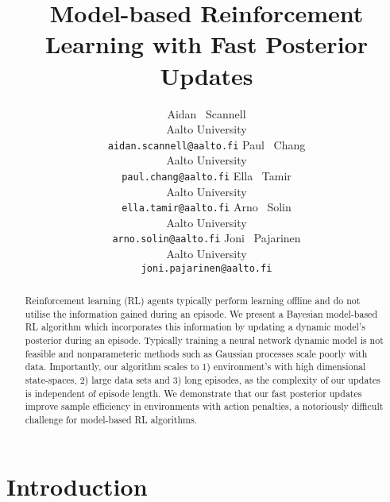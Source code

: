 \documentclass{article}
\title{Model-based Reinforcement Learning with Fast Posterior Updates}
\author{%
  Aidan ~Scannell \\
  Aalto University\\
  \texttt{aidan.scannell@aalto.fi}
  \And
  Paul ~Chang \\
  Aalto University\\
  \texttt{paul.chang@aalto.fi}
  \And
  Ella ~Tamir \\
  Aalto University\\
  \texttt{ella.tamir@aalto.fi}
  \And
  Arno ~Solin \\
  Aalto University\\
  \texttt{arno.solin@aalto.fi}
  \And
  Joni ~Pajarinen \\
  Aalto University\\
  \texttt{joni.pajarinen@aalto.fi}
}
\begin{document}
\maketitle

\begin{abstract}
  Reinforcement learning (RL) agents typically perform learning offline and do not utilise the information gained during an episode.
  We present a Bayesian model-based RL algorithm which incorporates this information by updating a dynamic model's posterior during an episode.
  Typically training a neural network dynamic model is not feasible and nonparameteric methods such as Gaussian processes scale poorly with data.
  Importantly, our algorithm scales to 1) environment's with high dimensional state-spaces, 2) large data sets and 3) long episodes,
  as the complexity of our updates is independent of episode length.
  We demonstrate that our fast posterior updates improve sample efficiency in environments with action penalties, a notoriously difficult
  challenge for model-based RL algorithms.
\end{abstract}

\section{Introduction} \label{sec:intro}
\end{document}
